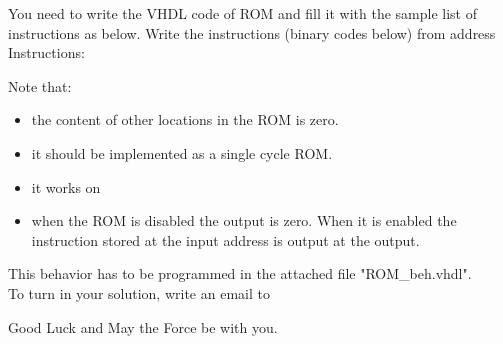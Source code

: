 \documentclass[a4paper,12pt]{article}
\begin{document}
You need to write the VHDL code of ROM and fill it with the sample list of instructions as below. Write the instructions (binary codes below) from address %
Instructions:
\begin{center}
\end{center}

Note that:

\begin{itemize}
\item the content of other locations in the ROM is zero.
\item it should be implemented as a single cycle ROM.
\item it works on %
\item when the ROM is disabled the output is zero. When it is enabled the instruction stored at the input address is output at the output. 
\end{itemize}

This behavior has to be programmed in the attached file "ROM\_beh.vhdl".\\

To turn in your solution, write an email to %

\vspace{0.7cm}

Good Luck and May the Force be with you.
\end{document}
